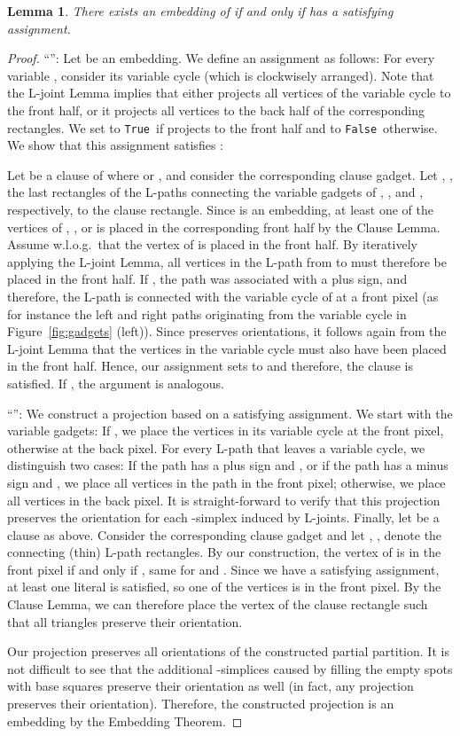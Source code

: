 \documentclass[12pt]{article}
\newcommand{\True}{\texttt{True}}
\newcommand{\False}{\texttt{False}}
\newtheorem{lemma}[theorem]{Lemma}
\begin{document}
\begin{lemma}\label{lem:sat_emb_equi}
There exists an embedding of  if and only if  has a satisfying assignment.
\end{lemma}
\begin{proof}
``'': Let  be an embedding. We define an assignment as follows: For
every variable , consider its variable cycle (which is clockwisely arranged).
Note that the L-joint Lemma implies that  either projects all vertices
of the variable cycle to the front half, or it projects all vertices to the back half
of the corresponding rectangles. 
We set  to \True\ if  projects to the front half
and to \False\ otherwise. We show that this assignment satisfies :

Let  be a clause of  where  or ,
and consider the corresponding clause gadget. Let , ,  the last rectangles
of the L-paths connecting the variable gadgets of , , and , respectively,
to the clause rectangle. Since  is an embedding, at least one of the vertices of , ,
or  is placed in the corresponding front half by the Clause Lemma.
Assume w.l.o.g.\ that the vertex of  is placed in the front half. By iteratively applying
the L-joint Lemma,
all vertices in the L-path from  to  must therefore be placed in the front half.
If , the path was associated with a plus sign, and therefore, the L-path is connected
with the variable cycle of  at a front pixel 
(as for instance the left and right paths originating from
the variable cycle in Figure~\ref{fig:gadgets} (left)). Since  preserves orientations, 
it follows again from the L-joint Lemma that the
vertices in the variable cycle must also have been placed in the front half. 
Hence, our assignment
sets  to  and therefore, the clause is satisfied. If , 
the argument is analogous.

``'': We construct a projection based on a satisfying 
assignment. We start with the variable gadgets: If , we place the vertices
in its variable cycle at the front pixel, otherwise at the back pixel.
For every L-path that leaves a variable cycle, we distinguish two cases: If
the path has a plus sign and , or if the path has a minus sign and , we place
all vertices in the path in the front pixel; otherwise, we place all vertices in the back
pixel. It is straight-forward to verify that this projection preserves the orientation
for each -simplex induced by L-joints.
Finally, let  be a clause as above. 
Consider the corresponding clause
gadget and let , ,  denote the connecting
(thin) L-path rectangles. By our construction, the vertex of  is in the front pixel
if and only if , same for  and . 
Since we have a satisfying assignment, at least one literal is
satisfied, so one of the vertices is in the front pixel. By the Clause Lemma,
we can therefore place the vertex of the clause rectangle such that all triangles
preserve their orientation.

Our projection preserves all orientations of the constructed partial partition.
It is not difficult to see that the additional -simplices caused by filling the empty spots
with base squares preserve their orientation as well (in fact, any projection preserves
their orientation). Therefore, the constructed projection is an embedding by the 
Embedding Theorem.
\end{proof}
\end{document}
